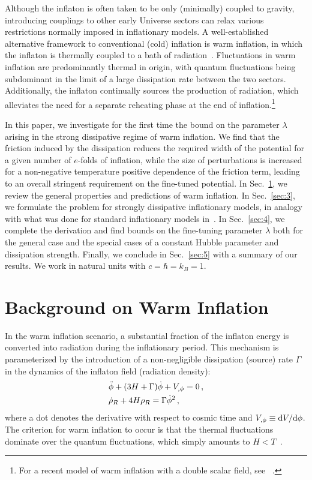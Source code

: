 \documentclass[aps,prd,twocolumn,amssymb,amsmath,floatfix,nofootinbib,superscriptaddress,preprintnumbers]{revtex4-1}
\begin{document}
Although the inflaton is often taken to be only (minimally) coupled to gravity, introducing couplings to other early Universe sectors can relax various restrictions normally imposed in inflationary models. A well-established alternative framework to conventional (cold) inflation is warm inflation, in which the inflaton is thermally coupled to a bath of radiation~\cite{Berera:1995ie,Berera:1995wh, Berera:1996fm}. Fluctuations in warm inflation are predominantly thermal in origin, with quantum fluctuations being subdominant in the limit of a large dissipation rate between the two sectors. Additionally, the inflaton continually sources the production of radiation, which alleviates the need for a separate reheating phase at the end of inflation.\footnote{For a recent model of warm inflation with a double scalar field, see ~\cite{DAgostino:2021vvv}.}

In this paper, we investigate for the first time the bound on the parameter $\lambda$ arising in the strong dissipative regime of warm inflation. We find that the friction induced by the dissipation reduces the required width of the potential for a given number of $e$-folds of inflation, while the size of perturbations is increased for a non-negative temperature positive dependence of the friction term, leading to an overall stringent requirement on the fine-tuned potential. In Sec.~\ref{sec:2}, we review the general properties and predictions of warm inflation. In Sec.~\ref{sec:3}, we formulate the problem for strongly dissipative inflationary models, in analogy with what was done for standard inflationary models in~\cite{Adams:1990pn}. In Sec.~\ref{sec:4}, we complete the derivation and find bounds on the fine-tuning parameter $\lambda$ both for the general case and the special cases of a constant Hubble parameter and dissipation strength. Finally, we conclude in Sec.~\ref{sec:5} with a summary of our results. We work in natural units with $c = \hbar = k_B = 1$.

\section{Background on Warm Inflation}\label{sec:2}

In the warm inflation scenario, a substantial fraction of the inflaton energy is converted into radiation during the inflationary period. This mechanism is parameterized by the introduction of a non-negligible dissipation (source) rate $\Gamma$ in the dynamics of the inflaton field (radiation density): 
\begin{align}
    &\Ddot{\phi}+(3H+\Gamma)\dot{\phi}+V_{,\phi}=0\,,\label{eq:2.1} \\
    &\Dot{\rho}_R+4H\rho_R=\Gamma \Dot{\phi}^2\,,  \label{eq:2.2}
\end{align}
where a dot denotes the derivative with respect to cosmic time and $V_{,\phi} \equiv {\rm d} V/{\rm d} \phi$. The criterion for warm inflation to occur is that the thermal fluctuations dominate over the quantum fluctuations, which simply amounts to $H<T$~\cite{Berera:1995ie}.
\end{document}
